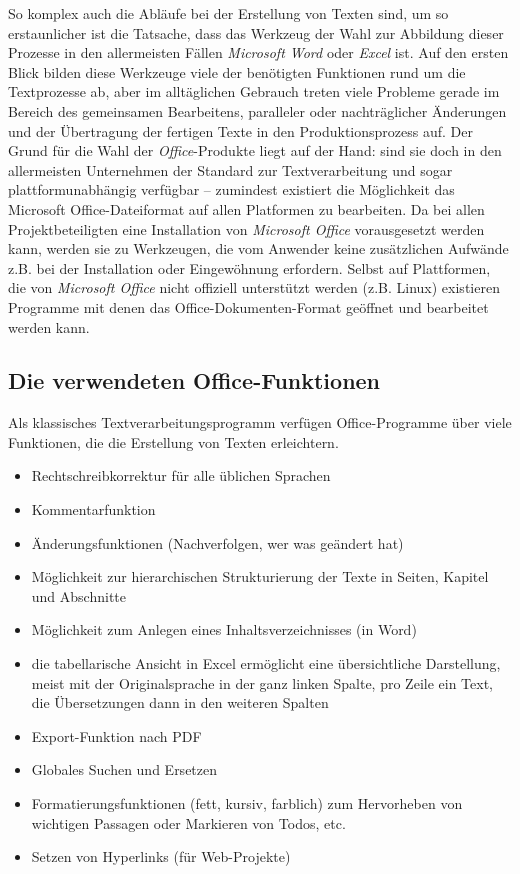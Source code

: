 So komplex auch die Abläufe bei der Erstellung von Texten sind, um so erstaunlicher ist die Tatsache, dass das Werkzeug der Wahl zur Abbildung dieser Prozesse in den allermeisten Fällen \emph{Microsoft Word} oder \emph{Excel} ist. Auf den ersten Blick bilden diese Werkzeuge viele der benötigten Funktionen rund um die Textprozesse ab, aber im alltäglichen Gebrauch treten viele Probleme gerade im Bereich des gemeinsamen Bearbeitens, paralleler oder nachträglicher Änderungen und der Übertragung der fertigen Texte in den Produktionsprozess auf. Der Grund für die Wahl der \emph{Office}-Produkte liegt auf der Hand: sind sie doch in den allermeisten Unternehmen der Standard zur Textverarbeitung und sogar plattformunabhängig verfügbar – zumindest existiert die Möglichkeit das Microsoft Office-Dateiformat auf allen Platformen zu bearbeiten. Da bei allen Projektbeteiligten eine Installation von \emph{Microsoft Office} vorausgesetzt werden kann, werden sie zu  Werkzeugen, die vom Anwender keine zusätzlichen Aufwände z.B. bei der Installation oder Eingewöhnung erfordern. Selbst auf Plattformen, die von \emph{Microsoft Office} nicht offiziell unterstützt werden (z.B. Linux) existieren Programme mit denen das Office-Dokumenten-Format geöffnet und bearbeitet werden kann.

\subsection{Die verwendeten Office-Funktionen}

Als klassisches Textverarbeitungsprogramm verfügen Office-Programme über viele Funktionen, die die Erstellung von Texten erleichtern.

\begin{itemize}
\item{Rechtschreibkorrektur für alle üblichen Sprachen}
\item{Kommentarfunktion}
\item{Änderungsfunktionen (Nachverfolgen, wer was geändert hat)}
\item{Möglichkeit zur hierarchischen Strukturierung der Texte in Seiten, Kapitel und Abschnitte}
\item{Möglichkeit zum Anlegen eines Inhaltsverzeichnisses (in Word)}
\item{die tabellarische Ansicht in Excel ermöglicht eine übersichtliche Darstellung, meist mit der Originalsprache in der ganz linken Spalte, pro Zeile ein Text, die Übersetzungen dann in den weiteren Spalten}
\item{Export-Funktion nach PDF}
\item{Globales Suchen und Ersetzen}
\item{Formatierungsfunktionen (fett, kursiv, farblich) zum Hervorheben von wichtigen Passagen oder Markieren von Todos, etc.}
\item{Setzen von Hyperlinks (für Web-Projekte)}
\end{itemize}

